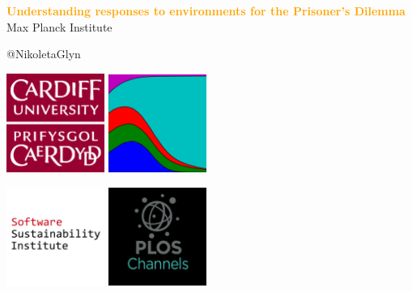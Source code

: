 \documentclass{beamer}
\begin{document}
\begin{frame}
    \begin{center}
        \LARGE{\textbf{\textcolor{orange}{Understanding responses to environments for the Prisoner's Dilemma}}} \\

        \vspace{1.5cm}
        \normalsize{Max Planck Institute}

        \vspace{1cm}
        \normalsize{@NikoletaGlyn}

    \end{center}
\end{frame}

\begin{frame}
    \begin{center}
    \includegraphics[width=0.24\textwidth]{static/cardiff_uni_logo.png}\hspace{6pt}
    \includegraphics[width=0.24\textwidth, height=0.245\textwidth]{static/axelrod-logo.png}\vspace{10pt}

    \hspace{2pt}\includegraphics[width=0.24\textwidth]{static/ssi-logo.png} \hspace{1pt}
    \includegraphics[width=0.24\textwidth]{static/plos-logo.jpg}

    \end{center}
\end{frame}
\end{document}
